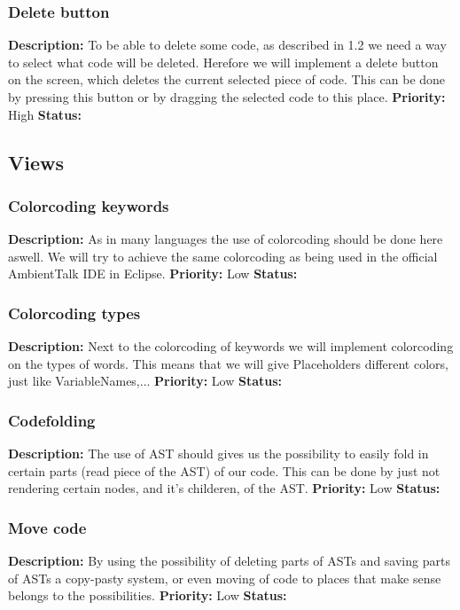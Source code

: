 \documentclass{article}
\begin{document}
\subsubsection{Delete button}
\textbf{Description: } To be able to delete some code, as described in 1.2 we need a way to select what code will be deleted. Herefore we will
implement a delete button on the screen, which deletes the current selected piece of code. This can be done by pressing this button or by dragging the selected code to this place. 
\textbf{Priority:} High \newline
\textbf{Status: } \newline
\subsection{Views}
\subsubsection{Colorcoding keywords}
\textbf{Description: }As in many languages the use of colorcoding should be done here aswell. We  will try to achieve the same colorcoding as
being used in the official AmbientTalk IDE in Eclipse. \newline
\textbf{Priority:} Low \newline
\textbf{Status: } \newline
\subsubsection{Colorcoding types}
\textbf{Description: } Next to the colorcoding of keywords we will implement colorcoding on the types of words. This means that we will give
Placeholders different colors, just like VariableNames,... \newline
\textbf{Priority:} Low \newline
\textbf{Status: } \newline
\subsubsection{Codefolding}
\textbf{Description: }The use of AST should gives us the possibility to easily fold in certain parts (read piece of the AST) of our code. This can be done by just not
rendering certain nodes, and it's childeren, of the AST. \newline
\textbf{Priority:} Low \newline
\textbf{Status: } \newline
\subsubsection{Move code}
\textbf{Description: } By using the possibility of deleting parts of ASTs and saving parts of ASTs a copy-pasty system, or even moving of code to places that make sense belongs
to the possibilities.\newline
\textbf{Priority:} Low \newline
\textbf{Status: } \newline
\end{document}
